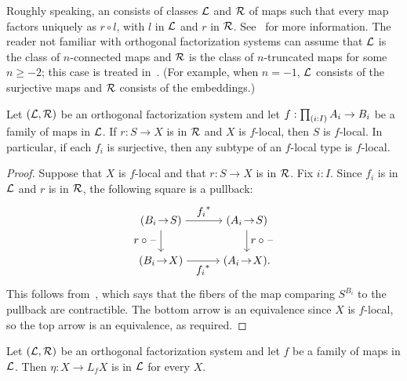 Roughly speaking, an  consists of
classes $\mathcal{L}$ and $\mathcal{R}$ of maps such that every map factors uniquely as
$r \circ l$, with $l$ in $\mathcal{L}$ and $r$ in $\mathcal{R}$.
See~\cite{RSS} for more information.
The reader not familiar with orthogonal factorization systems can assume
that $\mathcal{L}$ is the class of $n$-connected maps
and $\mathcal{R}$ is the class of $n$-truncated maps for some $n \geq -2$;
this case is treated in~\cite[Section 7.6]{hottbook}.
(For example, when $n = -1$, $\mathcal{L}$ consists of the surjective maps
and $\mathcal{R}$ consists of the embeddings.)

\begin{lem}\label{lemma:subtypes}
    Let $(\mathcal{L}, \mathcal{R})$ be an orthogonal factorization system and
    let $f : \prd{i:I} A_i \to B_i$ be a family of maps in $\mathcal{L}$.
    If $r : S \to X$ is in $\mathcal{R}$ and $X$ is $f$-local, then $S$ is $f$-local.
    In particular, if each $f_i$ is surjective,
    then any subtype of an $f$-local type is $f$-local.
\end{lem}

\begin{proof}
    Suppose that $X$ is $f$-local
    and that $r : S \to X$ is in $\mathcal{R}$.
    Fix $i : I$.
    Since $f_i$ is in $\mathcal{L}$ and $r$ is in $\mathcal{R}$, the following square is a pullback:
    \[
        \begin{tikzpicture}
          \matrix (m) [matrix of math nodes,row sep=2em,column sep=3em,minimum width=2em]
          { (B_i \sto S) & (A_i \sto S) \\
            (B_i \sto X) & (A_i \sto X) . \\};
          \path[->]
            (m-1-1) edge node [above] {$\precomp{f_i}$} (m-1-2)
                    edge node [left] {$r \circ \blank$} (m-2-1)
            (m-1-2) edge node [right] {$r \circ \blank$} (m-2-2)
            (m-2-1) edge node [below] {$\precomp{f_i}$} (m-2-2)
            ;
        \end{tikzpicture}
    \]
    This follows from~\cite[Lemma~1.44]{RSS}, which says that the fibers of
    the map comparing $S^{B_i}$ to the pullback are contractible.
    The bottom arrow is an equivalence since $X$ is $f$-local,
    so the top arrow is an equivalence, as required.
\end{proof}

\begin{thm}\label{theorem:localizationpreservesconnected}
    Let $(\mathcal{L}, \mathcal{R})$ be an orthogonal factorization system and
    let $f$ be a family of maps in $\mathcal{L}$.
    Then $\eta : X \to L_f X$ is in $\mathcal{L}$ for every $X$.
\end{thm}

